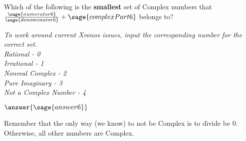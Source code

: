 \documentclass{ximera}
\begin{document}
\begin{exercise}
Which of the following is the \textbf{smallest} set of Complex numbers that $\frac{\sage{numerator6}}{\sage{denominator6}} + \sage{complexPart6} $ belongs to?

\textit{To work around current Xronos issues, input the corresponding number for the correct set. \\
Rational - 0 \\
Irrational - 1 \\
Nonreal Complex - 2 \\
Pure Imaginary - 3 \\
Not a Complex Number - 4
}

$\answer{\sage{answer6}}$
\begin{hint}
Remember that the only way (we know) to not be Complex is to divide be 0. Otherwise, all other numbers are Complex. 
\end{hint}
\end{exercise}
\end{document}
